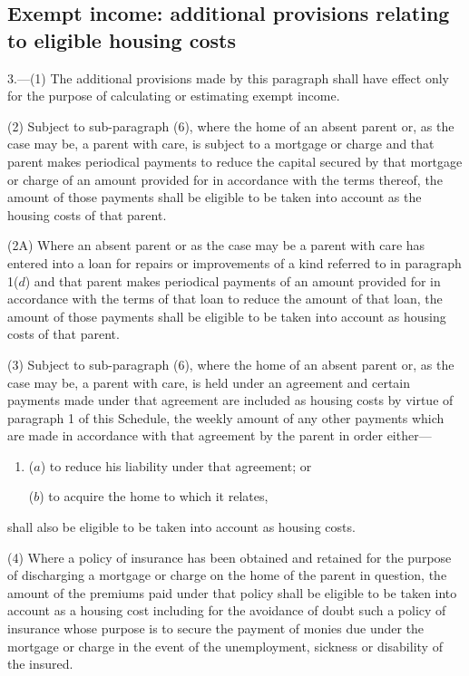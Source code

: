 \documentclass[a4paper]{article}
\begin{document}
\subsection*{Exempt income: additional provisions relating to eligible housing costs}

3.—(1) The additional provisions made by this paragraph shall have effect only for the purpose of calculating or estimating exempt income.

(2) Subject to sub-paragraph (6), where the home of an absent parent or, as the case may be, a parent with care, is subject to a mortgage or charge and that parent makes periodical payments to reduce the capital secured by that mortgage or charge of an amount provided for in accordance with the terms thereof, the amount of those payments shall be eligible to be taken into account as the housing costs of that parent.

(2A) Where an absent parent or as the case may be a parent with care has entered into a loan for repairs or improvements of a kind referred to in paragraph 1($d$) and that parent makes periodical payments of an amount provided for in accordance with the terms of that loan to reduce the amount of that loan, the amount of those payments shall be eligible to be taken into account as housing costs of that parent.

(3) Subject to sub-paragraph (6), where the home of an absent parent or, as the case may be, a parent with care, is held under an agreement and certain payments made under that agreement are included as housing costs by virtue of paragraph 1 of this Schedule, the weekly amount of any other payments which are made in accordance with that agreement by the parent in order either—
\begin{enumerate}\item[]
($a$) to reduce his liability under that agreement; or

($b$) to acquire the home to which it relates,
\end{enumerate}
shall also be eligible to be taken into account as housing costs.

(4) Where a policy of insurance has been obtained and retained for the purpose of discharging a mortgage or charge on the home of the parent in question, the amount of the premiums paid under that policy shall be eligible to be taken into account as a housing cost
including for the avoidance of doubt such a policy of insurance whose purpose is to secure the payment of monies due under the mortgage or charge in the event of the unemployment, sickness or disability of the insured.  %
\end{document}
